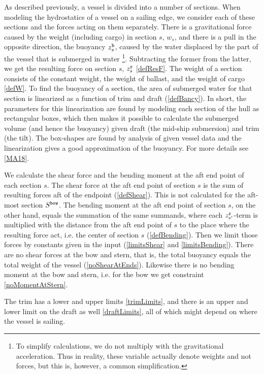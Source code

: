 As described previously, a vessel is divided into a number of sections. When modeling the hydrostatics of a vessel on a sailing edge, we consider each of these sections and the forces acting on them separately. There is a gravitational force caused by the weight (including cargo) in section $s$, $w_{s}$, and there is a pull in the opposite direction, the buoyancy $z^\texttt{b}_{s}$, caused by the water displaced by the part of the vessel that is submerged in water \footnote{To simplify calculations, we do not multiply with the gravitational acceleration. Thus in reality, these variable actually denote weights and not forces, but this is, however, a common simplification.}. Subtracting the former from the latter, we get the resulting force on section $s$, $z^\texttt{r}_{s}$ \eqref{defResF}. 
The weight of a section consists of the constant weight, the weight of ballast, and the weight of cargo \eqref{defW}.
To find the buoyancy of a section, the area of submerged water for that section is linearized as a function of trim and draft (\ref{defBancy}). 
In short, the parameters for this linearization are found by modeling each section of the hull as rectangular boxes, which then makes it possible to calculate the submerged volume (and hence the buoyancy) given draft (the mid-ship submersion) and trim (the tilt). The box-shapes are found by analysis of given vessel data and the linearization gives a good approximation of the buoyancy. For more details see \ref{MA18}. 

We calculate the shear force and the bending moment at the aft end point of each section $s$. The shear force at the aft end point of section $s$ is the sum of resulting forces aft of the endpoint (\ref{defShear}). This is not calculated for the aft-most section $S^\texttt{bow}$. The bending moment at the aft end point of section $s$, on the other hand, equals the summation of the same summands, where each $z^\texttt{r}_{s'}$-term is multiplied with the distance from the aft end point of $s$ to the place where the resulting force act, i.e. the center of section $s$ (\ref{defBending}). Then we limit those forces by constants given in the input (\eqref{limitsShear} and \eqref{limitsBending}).
There are no shear forces at the bow and stern, that is, the total buoyancy equals the total weight of the vessel (\ref{noShearAtEnds}).
Likewise there is no bending moment at the bow and stern, i.e. for the bow we get constraint \eqref{noMomentAtStern}.
					
The trim has a lower and upper limits \eqref{trimLimits}, and there is an upper and lower limit on the draft as well \eqref{draftLimits}, all of which might depend on where the vessel is sailing.
 
